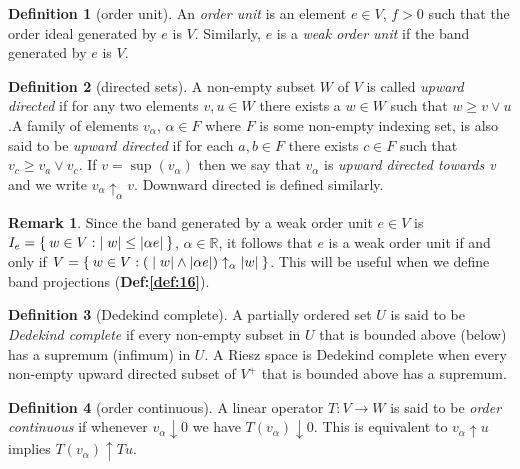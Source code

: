 \documentclass[letterpaper,10pt,oneside,onecolumn,reqno]{amsart}
\newcommand{\R}{\mathbb R}
\theoremstyle{definition}
\newtheorem{defn}{Definition}
\newtheorem{rem}{Remark}
\newcommand{\meet}{\wedge}
\newcommand{\join}{\vee}
\begin{document}
\begin{framed}
  \begin{defn}[order unit]\label{def:11}
    An \emph{order unit} is an element $e \in V$, $f
    > 0$ such that the order ideal generated by $e$ is $V$. Similarly, $e$
    is a \emph{weak order unit} if the band
    generated by $e$ is $V$.
  \end{defn}
  \begin{defn}[directed sets]\label{def:12}
    A non-empty subset $W$ of $V$ is called \emph{upward directed} if for any two elements $v,u \in W$
    there exists a $w \in W$ such that $w \geq v \join u$.A family of
    elements $v_{\alpha}$, $\alpha \in F$ where $F$ is some non-empty
    indexing set, is also said to be \emph{upward directed} if for
    each $a,b \in F$ there exists $c \in F$ such that $v_c \geq v_a
    \join v_c$. If $v = \sup({v_\alpha})$ then we say that
    $v_{\alpha}$ is \emph{upward directed towards v} and we write
    $v_{\alpha}\uparrow_{\alpha} v$. Downward directed is defined
    similarly.
    \begin{rem}\label{rem:2}
      Since the band generated by a weak order unit $e \in V$ is
      $I_{e} = \Set{w \in V: |w| \leq |\alpha e|}$, $\alpha \in \R$,
      it follows that $e$ is a weak order unit if and only if $V =
      \Set{w \in V : (|w| \meet |\alpha e|) \uparrow_{\alpha}
        |w|}$. This will be useful when we define band projections
      (\textbf{Def:\ref{def:16}}).
    \end{rem}
  \end{defn}
\end{framed}

\begin{defn}[Dedekind complete]\label{def:13}
  A partially ordered set $U$ is said to be \emph{Dedekind complete} if every non-empty subset in $U$
  that is bounded above (below) has a supremum (infimum) in $U$. A
  Riesz space is Dedekind complete when every non-empty upward
  directed subset of $V^+$ that is bounded above has a supremum.
\end{defn}

\begin{defn}[order continuous]\label{def:14}
  A linear operator $T : V \to W$ is said to be \emph{order continuous} if whenever $v_{\alpha} \downarrow
  0$ we have $T(v_{\alpha}) \downarrow 0$. This is equivalent to
  $v_{\alpha} \uparrow u$ implies $T(v_{\alpha}) \uparrow Tu$.
\end{defn}
\end{document}
